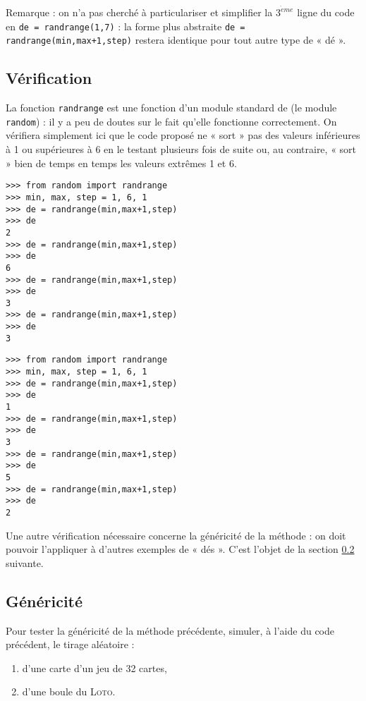 Remarque : on n'a pas cherché à 
particulariser et simplifier la $3^{\grave eme}$ ligne du code en \texttt{de = randrange(1,7)} :
la forme plus abstraite \texttt{de = randrange(min,max+1,step)} restera identique pour 
tout autre type de « dé ». 

\subsection{Vérification}\label{affectation:jeux:verification}
La fonction \texttt{randrange} est une fonction d'un module standard de \python{} 
(le module \texttt{random}) : 
il y a peu de doutes sur le fait qu'elle fonctionne correctement.
On vérifiera simplement ici que le code proposé ne « sort » pas des valeurs
inférieures à 1 ou supérieures à 6 en le testant plusieurs fois de suite ou, 
au contraire, « sort » bien de temps en temps les valeurs extrêmes 1 et 6.
\vspace*{2mm}
	
\begin{minipage}[t]{7cm}\footnotesize
\begin{Verbatim}
>>> from random import randrange
>>> min, max, step = 1, 6, 1
>>> de = randrange(min,max+1,step)
>>> de
2
>>> de = randrange(min,max+1,step)
>>> de
6
>>> de = randrange(min,max+1,step)
>>> de
3
>>> de = randrange(min,max+1,step)
>>> de
3
\end{Verbatim}
\end{minipage}
\hfill
\begin{minipage}[t]{7cm}\footnotesize
\begin{Verbatim}
>>> from random import randrange
>>> min, max, step = 1, 6, 1
>>> de = randrange(min,max+1,step)
>>> de
1
>>> de = randrange(min,max+1,step)
>>> de
3
>>> de = randrange(min,max+1,step)
>>> de
5
>>> de = randrange(min,max+1,step)
>>> de
2
\end{Verbatim}
\end{minipage}
\vspace*{2mm}

Une autre vérification nécessaire concerne la généricité de la méthode : on doit 
pouvoir l'appliquer à d'autres exemples de « dés ».
C'est l'objet de la section \ref{affectation:jeux:genericite} suivante.

\subsection{Généricité}\label{affectation:jeux:genericite}
Pour tester la généricité de la méthode précédente, 
simuler, à l'aide du code \python{} précédent, le tirage aléatoire :
\begin{enumerate}
\item d'une carte d'un jeu de 32 cartes,
\item d'une boule du \textsc{Loto}.
\end{enumerate}

